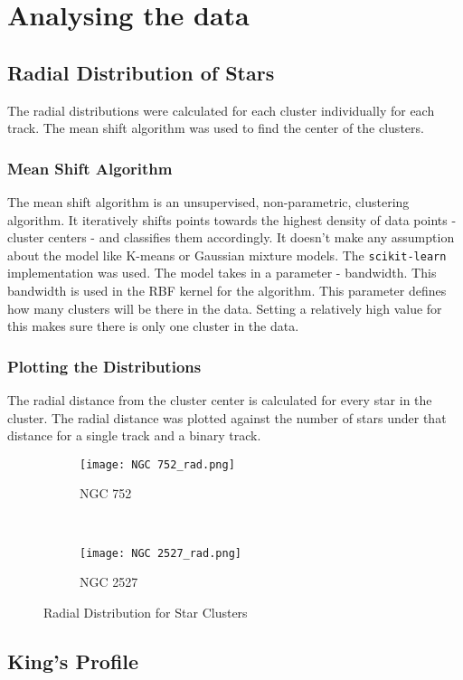 \chapter{Analysing the data}\label{ch:ch3}

\section{Radial Distribution of Stars}
The radial distributions were calculated for each cluster individually for each track. The mean shift algorithm was used to find the center of the clusters. 

\subsection{Mean Shift Algorithm}
The mean shift algorithm is an unsupervised, non-parametric, clustering algorithm. It iteratively shifts points towards the highest density of data points - cluster centers - and classifies them accordingly. It doesn't make any assumption about the model like K-means or Gaussian mixture models. The \lstinline{scikit-learn}\citep{scikit-learn} implementation was used. The model takes in a parameter - bandwidth. This bandwidth is used in the RBF kernel for the algorithm. This parameter defines how many clusters will be there in the data. Setting a relatively high value for this makes sure there is only one cluster in the data. 

\subsection{Plotting the Distributions}
The radial distance from the cluster center is calculated for every star in the cluster. The radial distance was plotted against the number of stars under that distance for a single track and a binary track. 

\begin{figure}[H]
\centering
\begin{subfigure}[b]{0.45\textwidth}
  \centering
  \texttt{[image: NGC 752\_rad.png]}
  \caption{NGC 752}
  \label{fig:im4}
 \end{subfigure}
~
\begin{subfigure}[b]{0.45\textwidth}
  \centering
  \texttt{[image: NGC 2527\_rad.png]}
  \caption{NGC 2527}
  \label{fig:im5}
\end{subfigure}
\caption{Radial Distribution for Star Clusters}
\label{fig:sim1}
\end{figure}

\section{King's Profile}

